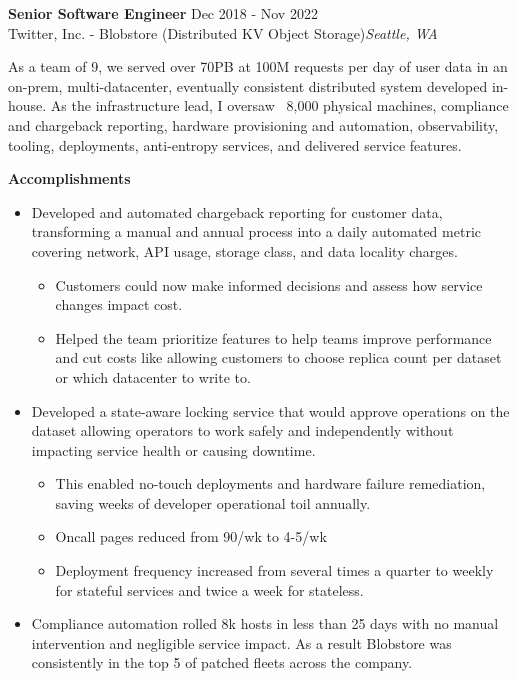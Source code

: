 \begin{mdframed}[linewidth=2,linecolor=blue, innertopmargin=1em, innerbottommargin=1em, topline=false, rightline=false, bottomline=false]
    \textbf{Senior Software Engineer} \hfill Dec 2018 - Nov 2022\\
    Twitter, Inc. - Blobstore (Distributed KV Object Storage)\hfill \textit{Seattle, WA}

    As a team of 9, we served over 70PB at 100M requests per day of user data in an on-prem, multi-datacenter, eventually consistent distributed system developed in-house. As the infrastructure lead, I oversaw ~8,000 physical machines, compliance and chargeback reporting, hardware provisioning and automation, observability, tooling, deployments, anti-entropy services, and delivered service features.
    
    {\bf Accomplishments}
     \begin{itemize}
        \itemsep -5pt {} 
         \item Developed and automated chargeback reporting for customer data, transforming a manual and annual process into a daily automated metric covering network, API usage, storage class, and data locality charges. 
         \begin{itemize}
            \item Customers could now make informed decisions and assess how service changes impact cost.
            \item Helped the team prioritize features to help teams improve performance and cut costs like allowing customers to choose replica count per dataset or which datacenter to write to. 
         \end{itemize}
         \item Developed a state-aware locking service that would approve operations on the dataset allowing operators to work safely and independently without impacting service health or causing downtime. 
         \begin{itemize}
            \item This enabled no-touch deployments and hardware failure remediation, saving weeks of developer operational toil annually.
            \item Oncall pages reduced from 90/wk to 4-5/wk
            \item Deployment frequency increased from several times a quarter to weekly for stateful services and twice a week for stateless.
         \end{itemize}
         \item Compliance automation rolled 8k hosts in less than 25 days with no manual intervention and negligible service impact. As a result Blobstore was consistently in the top 5 of patched fleets across the company. 

\end{itemize}
\end{mdframed}
